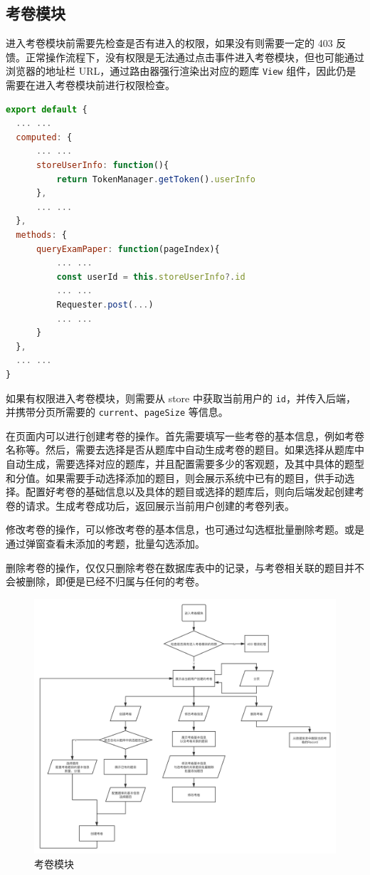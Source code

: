 \subsection{考卷模块}
进入考卷模块前需要先检查是否有进入的权限，如果没有则需要一定的 403 反馈。正常操作流程下，没有权限是无法通过点击事件进入考卷模块，但也可能通过浏览器的地址栏 URL，通过路由器强行渲染出对应的题库 \lstinline!View! 组件，因此仍是需要在进入考卷模块前进行权限检查。

\begin{lstlisting}[language=JavaScript]
export default {
  ... ...
  computed: {
      ... ...
      storeUserInfo: function(){
          return TokenManager.getToken().userInfo
      },
      ... ...
  },
  methods: {
      queryExamPaper: function(pageIndex){
          ... ...
          const userId = this.storeUserInfo?.id
          ... ...
          Requester.post(...)
          ... ...
      }
  },
  ... ...
}
\end{lstlisting}
如果有权限进入考卷模块，则需要从 store 中获取当前用户的 \lstinline!id!，并传入后端，并携带分页所需要的 \lstinline!current!、\lstinline!pageSize! 等信息。

在页面内可以进行创建考卷的操作。首先需要填写一些考卷的基本信息，例如考卷名称等。然后，需要去选择是否从题库中自动生成考卷的题目。如果选择从题库中自动生成，需要选择对应的题库，并且配置需要多少的客观题，及其中具体的题型和分值。如果需要手动选择添加的题目，则会展示系统中已有的题目，供手动选择。配置好考卷的基础信息以及具体的题目或选择的题库后，则向后端发起创建考卷的请求。生成考卷成功后，返回展示当前用户创建的考卷列表。

修改考卷的操作，可以修改考卷的基本信息，也可通过勾选框批量删除考题。或是通过弹窗查看未添加的考题，批量勾选添加。

删除考卷的操作，仅仅只删除考卷在数据库表中的记录，与考卷相关联的题目并不会被删除，即便是已经不归属与任何的考卷。
\begin{figure}[htb]
    \centering
    \includegraphics[width=\linewidth]{_images/考卷模块.png}
    \caption{考卷模块}
\end{figure}


